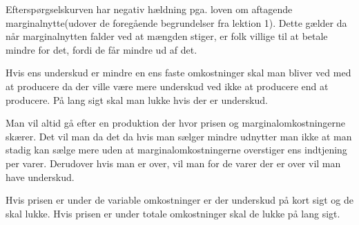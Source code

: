 Efterspørgselskurven har negativ hældning pga. loven om aftagende marginalnytte(udover de foregående begrundelser fra lektion 1). Dette gælder da når marginalnytten falder ved at mængden stiger, er folk villige til at betale mindre for det, fordi de får mindre ud af det.

Hvis ens underskud er mindre en ens faste omkostninger skal man bliver ved med at producere da der ville være mere underskud ved ikke at producere end at producere. På lang sigt skal man lukke hvis der er underskud. 

Man vil altid gå efter en produktion der hvor prisen og marginalomkostningerne skærer. Det vil man da det da hvis man sælger mindre udnytter man ikke at man stadig kan sælge mere uden at marginalomkostningerne overstiger ens indtjening per varer. Derudover hvis man er over, vil man for de varer der er over vil man have underskud.

Hvis prisen er under de variable omkostninger er der underskud på kort sigt og de skal lukke. Hvis prisen er under totale omkostninger skal de lukke på lang sigt. 




























